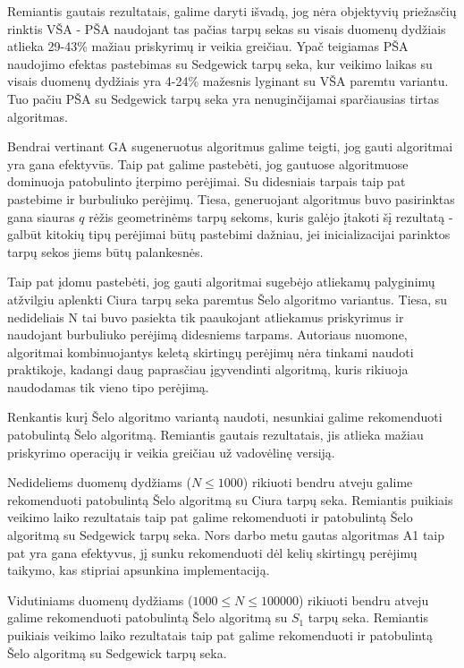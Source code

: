 \documentclass{VUMIFInfKursinis}
\begin{document}
Remiantis gautais rezultatais, galime daryti išvadą, jog nėra objektyvių priežasčių rinktis VŠA - 
PŠA naudojant tas pačias tarpų sekas su visais duomenų dydžiais atlieka 29-43\% mažiau priskyrimų ir veikia greičiau. 
Ypač teigiamas PŠA naudojimo efektas pastebimas su Sedgewick tarpų seka, kur veikimo laikas su visais duomenų dydžiais yra 4-24\% mažesnis lyginant su VŠA paremtu variantu.  
Tuo pačiu PŠA su Sedgewick tarpų seka yra nenuginčijamai sparčiausias tirtas algoritmas.

Bendrai vertinant GA sugeneruotus algoritmus galime teigti, jog gauti algoritmai yra gana efektyvūs.
Taip pat galime pastebėti, jog gautuose algoritmuose dominuoja patobulinto įterpimo perėjimai.
Su didesniais tarpais taip pat pastebime ir burbuliuko perėjimų.
Tiesa, generuojant algoritmus buvo pasirinktas gana siauras $q$ rėžis geometrinėms tarpų sekoms, kuris galėjo įtakoti šį rezultatą -
galbūt kitokių tipų perėjimai būtų pastebimi dažniau, jei inicializacijai parinktos tarpų sekos jiems būtų palankesnės.

Taip pat įdomu pastebėti, jog gauti algoritmai sugebėjo atliekamų palyginimų atžvilgiu aplenkti Ciura tarpų seka paremtus Šelo algoritmo variantus.
Tiesa, su nedideliais N tai buvo pasiekta tik paaukojant atliekamus priskyrimus ir naudojant burbuliuko perėjimą didesniems tarpams.
Autoriaus nuomone, algoritmai kombinuojantys keletą skirtingų perėjimų nėra tinkami naudoti praktikoje,
kadangi daug paprasčiau įgyvendinti algoritmą, kuris rikiuoja naudodamas tik vieno tipo perėjimą.


Renkantis kurį Šelo algoritmo variantą naudoti, nesunkiai galime rekomenduoti patobulintą Šelo algoritmą.
Remiantis gautais rezultatais, jis atlieka mažiau priskyrimo operacijų ir veikia greičiau už vadovėlinę versiją.

Nedideliems duomenų dydžiams ($N \leq 1000$) rikiuoti bendru atveju galime rekomenduoti patobulintą Šelo algoritmą su Ciura tarpų seka.
Remiantis puikiais veikimo laiko rezultatais taip pat galime rekomenduoti ir patobulintą Šelo algoritmą su Sedgewick tarpų seka.
Nors darbo metu gautas algoritmas A1 taip pat yra gana efektyvus, jį sunku rekomenduoti dėl
kelių skirtingų perėjimų taikymo, kas stipriai apsunkina implementaciją.

Vidutiniams duomenų dydžiams ($1000 \leq N \leq 100000$) rikiuoti bendru atveju galime rekomenduoti patobulintą Šelo algoritmą su $S_1$ tarpų seka.
Remiantis puikiais veikimo laiko rezultatais taip pat galime rekomenduoti ir patobulintą Šelo algoritmą su Sedgewick tarpų seka.
\end{document}
